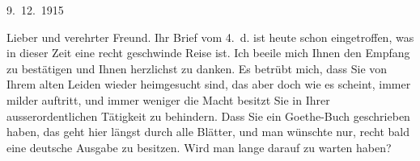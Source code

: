 \pstart
           \raggedleft{}9. 12. 1915\pend
           
\pstart\center{}Lieber und verehrter Freund.\pend\vspace{0.5em}
\pstart
           Ihr Brief vom 4. d. ist heute schon eingetroffen, was in dieser Zeit
               eine recht geschwinde Reise ist. Ich beeile mich Ihnen den Empfang zu bestätigen und
               Ihnen herzlichst zu danken. Es betrübt mich, dass Sie von Ihrem alten Leiden wieder
               heimgesucht sind, das aber doch wie es scheint, immer milder auftritt, und immer
               weniger die Macht besitzt Sie in Ihrer ausserordentlichen Tätigkeit zu behindern.
               Dass Sie ein Goethe-Buch geschrieben haben, das
               geht hier längst durch alle Blätter, und man wünschte nur, recht bald eine deutsche
               Ausgabe zu besitzen. Wird man lange darauf zu warten haben?\pend
           
